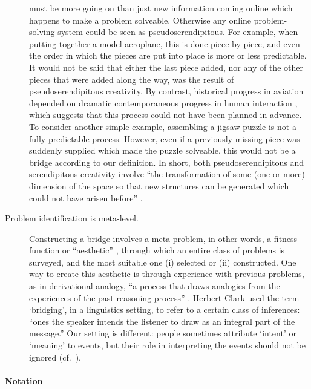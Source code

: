 \begin{description}
  must be more going on than just new information coming online which
  happens to make a problem solveable.  Otherwise any online
  problem-solving system could be seen as pseudoserendipitous.  For
  example, when putting together a model aeroplane, this is done piece
  by piece, and even the order in which the pieces are put into place
  is more or less predictable.  It would not be said that either the
  last piece added, nor any of the other pieces that were added along
  the way, was the result of pseudoserendipitous creativity.  By
  contrast, historical progress in aviation depended on dramatic
  contemporaneous progress in human interaction
  \cite[p.~292]{spenser2008airplane}, which suggests that this process
  could not have been planned in advance.  To consider another simple
  example, assembling a jigsaw puzzle is not a fully predictable
  process.  However, even if a previously missing piece was suddenly
  supplied which made the puzzle solveable, this would not be a bridge
  according to our definition.  In short, both pseudoserendipitous and
  serendipitous creativity involve ``the transformation of some (one
  or more) dimension of the space so that new structures can be
  generated which could not have arisen before''
  \cite[p.~348]{boden1998creativity}.
\item[Problem identification is meta-level.]  Constructing a bridge
  involves a meta-problem, in other words, a fitness function or
  ``aesthetic'' \cite{pease2011computational}, through which an entire
  class of problems is surveyed, and the most suitable one (i)
  selected or (ii) constructed.  One way to create this aesthetic is
  through experience with previous problems, as in derivational
  analogy, ``a process that draws analogies from the experiences of
  the past reasoning process'' \cite{Melis98anargument}. Herbert Clark
  \cite[p.~169]{Clark:1975:BRI:980190.980237} used the term
  `bridging', in a linguistics setting, to refer to a certain class of
  inferences: ``ones the speaker intends the listener to draw as an
  integral part of the message.''  Our setting is different: people
  sometimes attribute `intent' or `meaning' to events, but their role
  in interpreting the events should not be ignored
  (cf.~\cite{dennett_2013}).
\end{description}

\paragraph{\textbf{\upshape Notation}}

